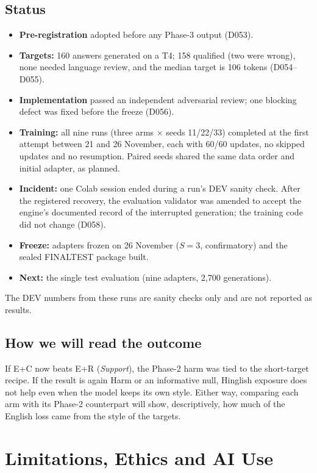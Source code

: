 \documentclass[12pt,a4paper,oneside]{report}
\renewcommand{\_}{\oldunderscore\allowbreak}
\begin{document}
\section{Status}

\begin{itemize}
\item \textbf{Pre-registration} adopted before any Phase-3 output (D053).
\item \textbf{Targets:} 160 answers generated on a T4; 158 qualified (two were wrong), none needed language review, and the median target is 106 tokens (D054--D055).
\item \textbf{Implementation} passed an independent adversarial review; one blocking defect was fixed before the freeze (D056).
\item \textbf{Training:} all nine runs (three arms $\times$ seeds 11/22/33) completed at the first attempt between 21 and 26 November, each with 60/60 updates, no skipped updates and no resumption. Paired seeds shared the same data order and initial adapter, as planned.
\item \textbf{Incident:} one Colab session ended during a run's DEV sanity check. After the registered recovery, the evaluation validator was amended to accept the engine's documented record of the interrupted generation; the training code did not change (D058).
\item \textbf{Freeze:} adapters frozen on 26 November ($S=3$, confirmatory) and the sealed FINAL\_TEST package built.
\item \textbf{Next:} the single test evaluation (nine adapters, 2,700 generations).
\end{itemize}
The DEV numbers from these runs are sanity checks only and are not reported as results.

\section{How we will read the outcome}

If E+C now beats E+R (\emph{Support}), the Phase-2 harm was tied to the short-target recipe. If the result is again Harm or an informative null, Hinglish exposure does not help even when the model keeps its own style. Either way, comparing each arm with its Phase-2 counterpart will show, descriptively, how much of the English loss came from the style of the targets.

\chapter{Limitations, Ethics and AI Use}
\label{ch:limits}
\end{document}
